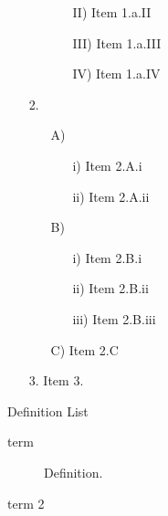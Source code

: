 \documentclass[a5paper]{book}
\begin{document}
\begin{german}
\begin{itemize}
\begin{itemize}
\begin{itemize}
\item[II)] 
Item 1.a.II\par

\item[III)] 
Item 1.a.III\par

\item[IV)] 
Item 1.a.IV\par
\end{itemize}
\end{itemize}

\item[2.] 
\begin{itemize}
\item[A)] 
\begin{itemize}
\item[i)] 
Item 2.A.i 
\par

\item[ii)] 
Item 2.A.ii\par
\end{itemize}

\item[B)] 
\begin{itemize}
\item[i)] 
Item 2.B.i\par

\item[ii)] 
Item 2.B.ii\par

\item[iii)] 
Item 2.B.iii\par
\end{itemize}

\item[C)] 
Item 2.C\par
\end{itemize}

\item[3.] 
Item 3.\par
\end{itemize}

Definition List\par

\begin{description}
\item[term] 

Definition.\par

\item[term 2] 


\end{description}
\end{german}
\end{document}
